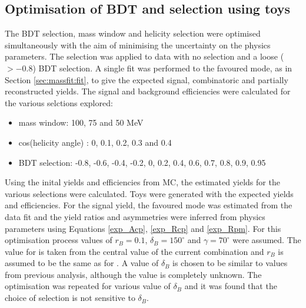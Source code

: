 \subsection{Optimisation of BDT and \Kstar selection using toys}
\label{sec:cpfit:optimisation}

The BDT selection, \Kstar mass window and \KS helicity selection were optimised simultaneously with the aim of minimising the uncertainty on the physics parameters. The selection was applied to data with no \Kstar selection and a loose ($>-0.8$) BDT selection. A single fit was performed to the favoured mode, as in Section \ref{sec:massfit:fit}, to give the expected signal, combinatoric and partially reconstructed yields. The signal and background efficiencies were calculated for the various selctions explored:

\begin{itemize}
\item{\Kstar mass window: 100, 75 and 50 MeV}
\item{\textbar cos(\KS helicity angle) \textbar : 0, 0.1, 0.2, 0.3 and 0.4}
\item{BDT selection: -0.8, -0.6, -0.4, -0.2, 0, 0.2, 0.4, 0.6, 0.7, 0.8, 0.9, 0.95}
\end{itemize}

Using the inital yields and efficiencies from MC, the estimated yields for the various selections were calculated. Toys were generated with the expected yields and efficiencies. For the signal yield, the favoured mode was estimated from the data fit and the yield ratios and asymmetries were inferred from physics parameters using Equations \ref{exp_Acp}, \ref{exp_Rcp} and \ref{exp_Rpm}. For this optimisation process values of $r_B = 0.1$, $\delta_B = 150^{\circ}$ and $\gamma = 70^{\circ}$ were assumed. The value for \Pgamma is taken from the central value of the current \lhcb combination and $r_B$ is assumed to be the same as for \decay{\B}{\D\kaon}. A value of $\delta_B$ is chosen to be similar to values from previous analysis, although the value is completely unknown. The optimisation was repeated for various value of $\delta_B$ and it was found that the choice of selection is not sensitive to $\delta_B$.

